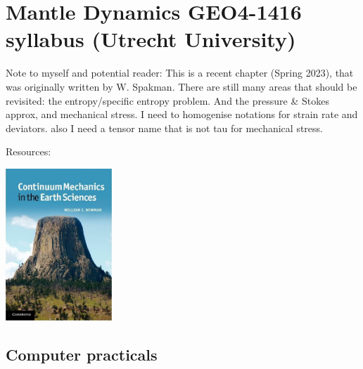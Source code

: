 \chapter{Mantle Dynamics GEO4-1416 syllabus (Utrecht University)} %

\begin{remark}
Note to myself and potential reader: This is a recent chapter (Spring 2023),
that was originally written by W. Spakman. 
There are still many areas that should be revisited: the entropy/specific entropy problem. 
And the pressure \& Stokes approx, and mechanical stress.  
I need to homogenise notations for strain rate and deviators.
also I need a tensor name that is not tau for mechanical stress.
\end{remark}

Resources:

\begin{center}
\includegraphics[width=4cm]{images/chapter_md/newman}\\
\end{center}




\newpage

\section{Computer practicals} 
